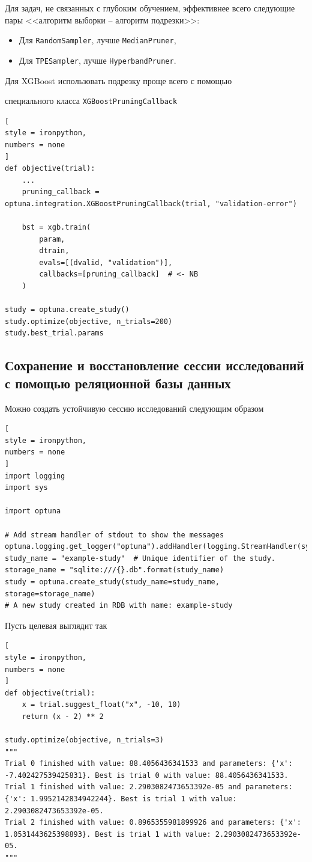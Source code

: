 \documentclass[%
	11pt,
	a4paper,
	utf8,
		]{article}
\begin{document}
Для задач, не связанных с глубоким обучением, эффективнее всего следующие пары <<алгоритм выборки -- алгоритм подрезки>>:
\begin{itemize}
	\item Для \verb|RandomSampler|, лучше \verb|MedianPruner|,
	
	\item Для \verb|TPESampler|, лучше \verb|HyperbandPruner|.
\end{itemize}



Для XGBoost использовать подрезку проще всего с помощью 

специального класса \verb|XGBoostPruningCallback|
\begin{lstlisting}[
style = ironpython,
numbers = none
]
def objective(trial):
    ...
	pruning_callback = optuna.integration.XGBoostPruningCallback(trial, "validation-error")
	
	bst = xgb.train(
	    param,
	    dtrain,
	    evals=[(dvalid, "validation")],
	    callbacks=[pruning_callback]  # <- NB
	)
	
study = optuna.create_study()
study.optimize(objective, n_trials=200)
study.best_trial.params
\end{lstlisting}

\subsection{Сохранение и восстановление сессии исследований с помощью реляционной базы данных}

Можно создать устойчивую сессию исследований следующим образом
\begin{lstlisting}[
style = ironpython,
numbers = none
]
import logging
import sys

import optuna

# Add stream handler of stdout to show the messages
optuna.logging.get_logger("optuna").addHandler(logging.StreamHandler(sys.stdout))
study_name = "example-study"  # Unique identifier of the study.
storage_name = "sqlite:///{}.db".format(study_name)
study = optuna.create_study(study_name=study_name, storage=storage_name)
# A new study created in RDB with name: example-study
\end{lstlisting}

Пусть целевая выглядит так
\begin{lstlisting}[
style = ironpython,
numbers = none
]
def objective(trial):
	x = trial.suggest_float("x", -10, 10)
	return (x - 2) ** 2

study.optimize(objective, n_trials=3)
"""
Trial 0 finished with value: 88.4056436341533 and parameters: {'x': -7.402427539425831}. Best is trial 0 with value: 88.4056436341533.
Trial 1 finished with value: 2.2903082473653392e-05 and parameters: {'x': 1.9952142834942244}. Best is trial 1 with value: 2.2903082473653392e-05.
Trial 2 finished with value: 0.8965355981899926 and parameters: {'x': 1.0531443625398893}. Best is trial 1 with value: 2.2903082473653392e-05.
"""
\end{lstlisting}
\end{document}
